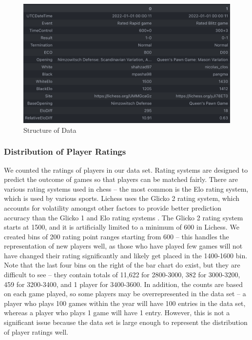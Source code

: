\documentclass[a4paper, 11pt]{article}
\begin{document}
\begin{figure}[H]
    \centering
    \caption{Structure of Data}
    \label{fig:structureOfData}
    \includegraphics[width=\textwidth]{Structure of Data Transposed.png}
\end{figure}

\subsubsection{Distribution of Player Ratings}
We counted the ratings of players in our data set. Rating systems are designed to predict the outcome of games so that players can be matched fairly. There are various rating systems used in chess -- the most common is the Elo rating system, which is used by various sports. Lichess uses the Glicko 2 rating system, which accounts for volatility amongst other factors to provide better prediction accuracy than the Glicko 1 and Elo rating systems \cite{chessRatingSystems, DeloitteFIDEChessRatingChallenge}. The Glicko 2 rating system starts at 1500, and it is artificially limited to a minimum of 600 in Lichess. We created bins of 200 rating point ranges starting from 600 -- this handles the representation of new players well, as those who have played few games will not have changed their rating significantly and likely get placed in the 1400-1600 bin. Note that the last four bins on the right of the bar chart do exist, but they are difficult to see -- they contain totals of 11,622 for 2800-3000, 382 for 3000-3200, 459 for 3200-3400, and 1 player for 3400-3600. In addition, the counts are based on each game played, so some players may be overrepresented in the data set -- a player who plays 100 games within the year will have 100 entries in the data set, whereas a player who plays 1 game will have 1 entry. However, this is not a significant issue because the data set is large enough to represent the distribution of player ratings well.
\end{document}
